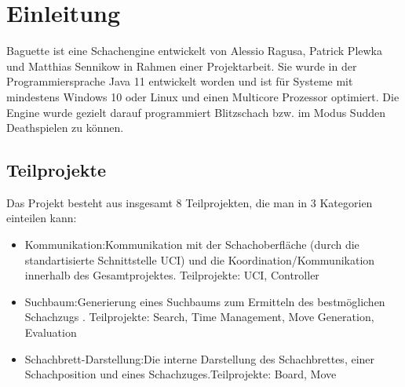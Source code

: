 \section{Einleitung}
Baguette ist eine Schachengine entwickelt von Alessio Ragusa, Patrick Plewka und Matthias Sennikow in Rahmen einer Projektarbeit.
Sie wurde in der Programmiersprache Java 11 entwickelt worden und ist für Systeme mit mindestens Windows 10 oder Linux und einen Multicore Prozessor optimiert. \newline
Die Engine wurde gezielt darauf programmiert Blitzschach bzw. im Modus Sudden Death spielen zu k\"onnen.\newline
\subsection{Teilprojekte}
Das Projekt besteht aus insgesamt 8 Teilprojekten, die man in 3 Kategorien einteilen kann:
\begin{itemize}
    \item{Kommunikation:\newline Kommunikation mit der Schachoberfl\"ache (durch die standartisierte Schnittstelle UCI) und die Koordination/Kommunikation innerhalb des Gesamtprojektes.
        \newline Teilprojekte: UCI, Controller}
    \item{Suchbaum:\newline Generierung eines Suchbaums zum Ermitteln des bestmöglichen Schachzugs . \newline Teilprojekte:  Search, Time Management, Move Generation, Evaluation}
    \item{Schachbrett-Darstellung:\newline Die interne Darstellung des Schachbrettes, einer Schachposition und eines Schachzuges.\newline Teilprojekte: Board, Move}
\end{itemize}

